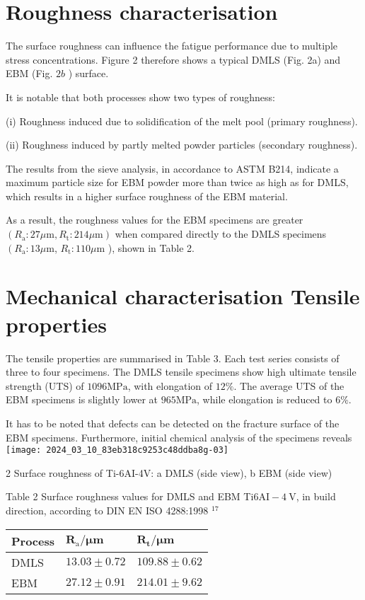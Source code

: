\documentclass[10pt]{article}
\begin{document}
\section*{Roughness characterisation}
The surface roughness can influence the fatigue performance due to multiple stress concentrations. Figure 2 therefore shows a typical DMLS (Fig. 2a) and EBM (Fig. $2 b$ ) surface.

It is notable that both processes show two types of roughness:

(i) Roughness induced due to solidification of the melt pool (primary roughness).

(ii) Roughness induced by partly melted powder particles (secondary roughness).

The results from the sieve analysis, in accordance to ASTM B214, indicate a maximum particle size for EBM powder more than twice as high as for DMLS, which results in a higher surface roughness of the EBM material.

As a result, the roughness values for the EBM specimens are greater $\left(R_{\mathrm{a}}: 27 \mu \mathrm{m}, R_{\mathrm{t}}: 214 \mu \mathrm{m}\right)$ when compared directly to the DMLS specimens $\left(R_{\mathrm{a}}: 13 \mu \mathrm{m}\right.$, $R_{\mathrm{t}}: 110 \mu \mathrm{m}$ ), shown in Table 2.

\section*{Mechanical characterisation Tensile properties}
The tensile properties are summarised in Table 3. Each test series consists of three to four specimens. The DMLS tensile specimens show high ultimate tensile strength (UTS) of $1096 \mathrm{MPa}$, with elongation of $12 \%$. The average UTS of the EBM specimens is slightly lower at $965 \mathrm{MPa}$, while elongation is reduced to $6 \%$.

It has to be noted that defects can be detected on the fracture surface of the EBM specimens. Furthermore, initial chemical analysis of the specimens reveals\\
\texttt{[image: 2024\_03\_10\_83eb318c9253c48ddba8g-03]}

2 Surface roughness of Ti-6AI-4V: a DMLS (side view), b EBM (side view)

Table 2 Surface roughness values for DMLS and EBM Ti$6 \mathrm{AI}-4 \mathrm{~V}$, in build direction, according to DIN EN ISO 4288:1998 ${ }^{17}$

\begin{center}
\begin{tabular}{lll}
\hline
Process & $\boldsymbol{R}_{\mathrm{a}} / \boldsymbol{\mu m}$ & $\boldsymbol{R}_{\mathbf{t}} / \boldsymbol{\mu m}$ \\
\hline
DMLS & $13.03 \pm 0.72$ & $109.88 \pm 0.62$ \\
EBM & $27.12 \pm 0.91$ & $214.01 \pm 9.62$ \\
\hline
\end{tabular}
\end{center}
\end{document}
